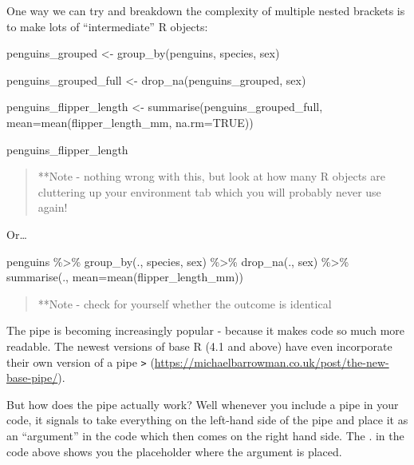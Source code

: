 \documentclass[
]{book}
\newenvironment{Shaded}{\begin{snugshade}}{\end{snugshade}}
\newcommand{\AttributeTok}[1]{\textcolor[rgb]{0.77,0.63,0.00}{#1}}
\newcommand{\ConstantTok}[1]{\textcolor[rgb]{0.00,0.00,0.00}{#1}}
\newcommand{\FunctionTok}[1]{\textcolor[rgb]{0.00,0.00,0.00}{#1}}
\newcommand{\NormalTok}[1]{#1}
\newcommand{\OtherTok}[1]{\textcolor[rgb]{0.56,0.35,0.01}{#1}}
\newcommand{\SpecialCharTok}[1]{\textcolor[rgb]{0.00,0.00,0.00}{#1}}
\begin{document}
One way we can try and breakdown the complexity of multiple nested brackets is to make lots of ``intermediate'' R objects:

\begin{Shaded}
\begin{Highlighting}[]
\NormalTok{penguins\_grouped }\OtherTok{\textless{}{-}} \FunctionTok{group\_by}\NormalTok{(penguins, species, sex)}

\NormalTok{penguins\_grouped\_full }\OtherTok{\textless{}{-}} \FunctionTok{drop\_na}\NormalTok{(penguins\_grouped, sex)}

\NormalTok{penguins\_flipper\_length }\OtherTok{\textless{}{-}} \FunctionTok{summarise}\NormalTok{(penguins\_grouped\_full, }\AttributeTok{mean=}\FunctionTok{mean}\NormalTok{(flipper\_length\_mm, }\AttributeTok{na.rm=}\ConstantTok{TRUE}\NormalTok{))}

\NormalTok{penguins\_flipper\_length}
\end{Highlighting}
\end{Shaded}

\begin{quote}
**Note - nothing wrong with this, but look at how many R objects are cluttering up your environment tab which you will probably never use again!
\end{quote}

Or\ldots{}

\begin{Shaded}
\begin{Highlighting}[]
\NormalTok{penguins }\SpecialCharTok{\%\textgreater{}\%} 
  \FunctionTok{group\_by}\NormalTok{(., species, sex) }\SpecialCharTok{\%\textgreater{}\%} 
  \FunctionTok{drop\_na}\NormalTok{(., sex) }\SpecialCharTok{\%\textgreater{}\%} 
  \FunctionTok{summarise}\NormalTok{(., }\AttributeTok{mean=}\FunctionTok{mean}\NormalTok{(flipper\_length\_mm))}
\end{Highlighting}
\end{Shaded}

\begin{quote}
**Note - check for yourself whether the outcome is identical
\end{quote}

The pipe is becoming increasingly popular - because it makes code so much more readable. The newest versions of base R (4.1 and above) have even incorporate their own version of a pipe \texttt{\textbar{}\textgreater{}} (\url{https://michaelbarrowman.co.uk/post/the-new-base-pipe/}).

But how does the pipe actually work? Well whenever you include a pipe in your code, it signals to take everything on the left-hand side of the pipe and place it as an ``argument'' in the code which then comes on the right hand side. The . in the code above shows you the placeholder where the argument is placed.
\end{document}
